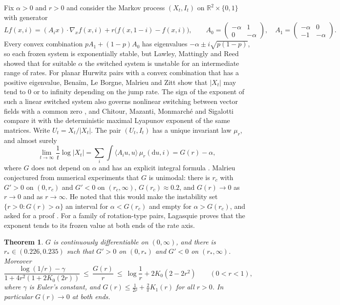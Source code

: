 \documentclass[11pt]{amsart}
\newtheorem{theorem}{Theorem}[section]
\theoremstyle{remark}
\numberwithin{equation}{section}
\begin{document}
Fix $\alpha>0$ and $r>0$ and consider the Markov process $(X_t,I_t)$ on $\mathbb R^2\times\{0,1\}$ with generator
\begin{equation}\label{eq:gen}
Lf(x,i)=(A_ix)\cdot\nabla_xf(x,i)+r\bigl(f(x,1-i)-f(x,i)\bigr),\qquad
A_0=\begin{pmatrix}-\alpha&1\\0&-\alpha\end{pmatrix},\quad A_1=\begin{pmatrix}-\alpha&0\\-1&-\alpha\end{pmatrix}.
\end{equation}
Every convex combination $pA_1+(1-p)A_0$ has eigenvalues $-\alpha\pm i\sqrt{p(1-p)}$, so each frozen system is exponentially stable, but Lawley, Mattingly and Reed \cite{LMR} showed that for suitable $\alpha$ the switched system is unstable for an intermediate range of rates. For planar Hurwitz pairs with a convex combination that has a positive eigenvalue, Bena\"im, Le Borgne, Malrieu and Zitt \cite{BLMZ} show that $|X_t|$ may tend to $0$ or to infinity depending on the jump rate. The sign of the exponent of such a linear switched system also governs nonlinear switching between vector fields with a common zero \cite{BS}, and Chitour, Mazanti, Monmarch\'e and Sigalotti \cite{CMMS} compare it with the deterministic maximal Lyapunov exponent of the same matrices. Write $U_t=X_t/|X_t|$. The pair $(U_t,I_t)$ has a unique invariant law $\mu_r$, and almost surely
\[
\lim_{t\to\infty}\frac1t\log|X_t|=\sum_{i}\int\langle A_iu,u\rangle\,\mu_r(\mathrm du,i)=G(r)-\alpha,
\]
where $G$ does not depend on $\alpha$ and has an explicit integral formula \cite[Theorem 4.1]{Ma}. Malrieu \cite[Conjecture 4.3]{Ma} conjectured from numerical experiments that $G$ is unimodal: there is $r_c$ with $G'>0$ on $(0,r_c)$ and $G'<0$ on $(r_c,\infty)$, $G(r_c)\approx0.2$, and $G(r)\to0$ as $r\to0$ and as $r\to\infty$. He noted that this would make the instability set $\{r>0:G(r)>\alpha\}$ an interval for $\alpha<G(r_c)$ and empty for $\alpha>G(r_c)$, and asked for a proof \cite[Open question 2]{Ma}. For a family of rotation-type pairs, Lagasquie \cite{La} proves that the exponent tends to its frozen value at both ends of the rate axis.

\begin{theorem}\label{thm:main}
$G$ is continuously differentiable on $(0,\infty)$, and there is $r_*\in(0.226,0.235)$ such that $G'>0$ on $(0,r_*)$ and $G'<0$ on $(r_*,\infty)$. Moreover
\[
\frac{\log(1/r)-\gamma}{1+4r^2(1+2K_0(2r))}\ \le\ \frac{G(r)}{r}\ \le\ \log\frac1r+2K_0(2-2r^2)\qquad(0<r<1),
\]
where $\gamma$ is Euler's constant, and $G(r)\le \frac1{2r}+\frac2\pi K_1(r)$ for all $r>0$. In particular $G(r)\to0$ at both ends.
\end{theorem}
\end{document}

